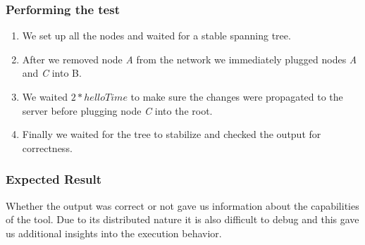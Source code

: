 \subsubsection{Performing the test}
\begin{enumerate}
    \item We set up all the nodes and waited for a stable spanning tree.
    \item After we removed node \textit{A} from the network we immediately plugged nodes \textit{A} and \textit{C} into B.
    \item We waited $2*helloTime$ to make sure the changes were propagated to the server before plugging node \textit{C} into the root.
    \item Finally we waited for the tree to stabilize and checked the output for correctness.
\end{enumerate}

\subsubsection{Expected Result}
Whether the output was correct or not gave us information about the capabilities of the tool.
Due to its distributed nature it is also difficult to debug and this gave us additional insights into the execution behavior.
